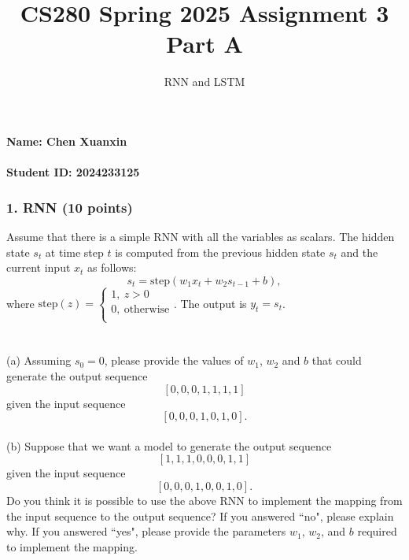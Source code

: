 \documentclass[12pt]{article}%
\begin{document}
\title{CS280 Spring 2025 Assignment 3 \\ Part A}
\author{RNN and LSTM}
\maketitle

\paragraph{Name: Chen Xuanxin}

\paragraph{Student ID: 2024233125}

\newpage


\subsubsection*{1. RNN (10 points)}
Assume that there is a simple RNN with all the variables as scalars. The hidden state $s_t$ at time step $t$ is computed from the previous hidden state $s_t$ and the current input $x_t$ as follows: 
$$s_t = \text{step}(w_1x_t+w_2s_{t-1}+b),$$
where $ \text{step}(z)=\left\{
	\begin{array}{ll}
	  1,\ z>0\\
	  0,\ \text{otherwise}\\
	\end{array}
  \right. $. The output is $y_t=s_t$.
\\\\\\
\noindent (a) Assuming $s_0 = 0$, please provide the values of $w_1$, $w_2$ and $b$ that could generate the output sequence
$$[0, 0, 0, 1, 1, 1, 1]$$
given the input sequence
$$[0, 0, 0, 1, 0, 1, 0].$$
\\

\noindent (b) Suppose that we want a model to generate the output sequence
$$[1, 1, 1, 0, 0, 0, 1, 1]$$
given the input sequence
$$[0, 0, 0, 1, 0, 0, 1, 0].$$
Do you think it is possible to use the above RNN to implement the mapping from the input sequence to the output sequence? If you answered ``no", please explain why. If you answered ``yes", please provide the parameters $w_1$, $w_2$, and $b$ required to implement the mapping.
		
\newpage



\newpage
\end{document}
